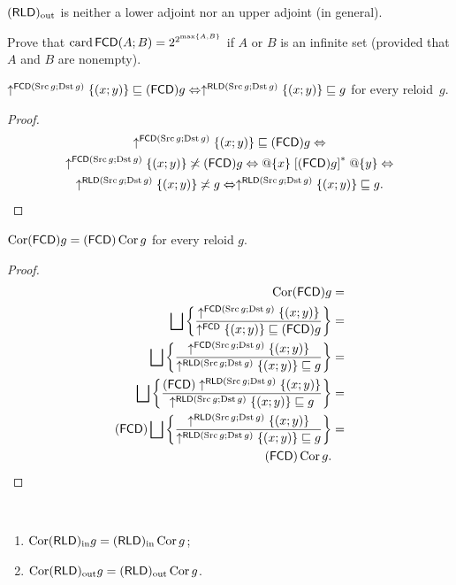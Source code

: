 \begin{conjecture}
$(\mathsf{RLD})_{\mathrm{out}}$ is neither a lower adjoint nor an upper adjoint (in general).\end{conjecture}
\begin{xca}
Prove that $\operatorname{card}\mathsf{FCD}(A;B)=2^{2^{\max\{A,B\}}}$ if $A$ or
$B$ is an infinite set (provided that $A$ and $B$ are nonempty).\end{xca}
\begin{lem}
$\uparrow^{\mathsf{FCD}(\operatorname{Src} g;\operatorname{Dst} g)}\{(x;y)\}\sqsubseteq(\mathsf{FCD}) g\Leftrightarrow\uparrow^{\mathsf{RLD}(\operatorname{Src} g;\operatorname{Dst} g)}\{(x;y)\}\sqsubseteq g$
for every reloid~$g$.\end{lem}
\begin{proof}
~
\begin{multline*}
\uparrow^{\mathsf{FCD}(\operatorname{Src} g;\operatorname{Dst} g)}\{(x;y)\}\sqsubseteq(\mathsf{FCD}) g\Leftrightarrow\\
\uparrow^{\mathsf{FCD}(\operatorname{Src} g;\operatorname{Dst} g)}\{(x;y)\}\not\asymp(\mathsf{FCD}) g\Leftrightarrow @\{x\}\mathrel{\left[(\mathsf{FCD}) g\right]^{\ast}}@\{y\}\Leftrightarrow\\
\uparrow^{\mathsf{RLD}(\operatorname{Src} g;\operatorname{Dst} g)}\{(x;y)\}\not\asymp g\Leftrightarrow\uparrow^{\mathsf{RLD}(\operatorname{Src} g;\operatorname{Dst} g)}\{(x;y)\}\sqsubseteq g.
\end{multline*}
\end{proof}
\begin{thm}
$\operatorname{Cor}(\mathsf{FCD}) g=(\mathsf{FCD})\operatorname{Cor} g$ for every reloid $g$.\end{thm}
\begin{proof}
~
\begin{align*}
\operatorname{Cor}(\mathsf{FCD}) g & =\\
\bigsqcup\left\{ \frac{\uparrow^{\mathsf{FCD}(\operatorname{Src} g;\operatorname{Dst} g)}\{(x;y)\}}{\uparrow^{\mathsf{FCD}}\{(x;y)\}\sqsubseteq(\mathsf{FCD}) g}\right\} & =\\
\bigsqcup\left\{ \frac{\uparrow^{\mathsf{FCD}(\operatorname{Src} g;\operatorname{Dst} g)}\{(x;y)\}}{\uparrow^{\mathsf{RLD}(\operatorname{Src} g;\operatorname{Dst} g)}\{(x;y)\}\sqsubseteq g}\right\} & =\\
\bigsqcup\left\{ \frac{(\mathsf{FCD})\uparrow^{\mathsf{RLD}(\operatorname{Src} g;\operatorname{Dst} g)}\{(x;y)\}}{\uparrow^{\mathsf{RLD}(\operatorname{Src} g;\operatorname{Dst} g)}\{(x;y)\}\sqsubseteq g}\right\} & =\\
(\mathsf{FCD})\bigsqcup\left\{ \frac{\uparrow^{\mathsf{RLD}(\operatorname{Src} g;\operatorname{Dst} g)}\{(x;y)\}}{\uparrow^{\mathsf{RLD}(\operatorname{Src} g;\operatorname{Dst} g)}\{(x;y)\}\sqsubseteq g}\right\} & =\\
(\mathsf{FCD})\operatorname{Cor} g.
\end{align*}
\end{proof}
\begin{conjecture}
~
\begin{enumerate}
\item $\operatorname{Cor}(\mathsf{RLD})_{\mathrm{in}} g=(\mathsf{RLD})_{\mathrm{in}}\operatorname{Cor} g$;
\item $\operatorname{Cor}(\mathsf{RLD})_{\mathrm{out}} g=(\mathsf{RLD})_{\mathrm{out}}\operatorname{Cor} g$.
\end{enumerate}
\end{conjecture}


